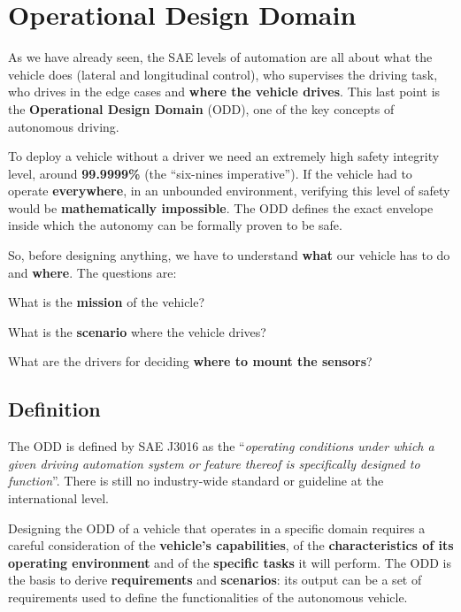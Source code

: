 \section{Operational Design Domain}

As we have already seen, the SAE levels of automation are all about what the vehicle does (lateral and longitudinal control), who supervises the driving task, who drives in the edge cases and \textbf{where the vehicle drives}.
This last point is the \textbf{Operational Design Domain} (ODD), one of the key concepts of autonomous driving.

To deploy a vehicle without a driver we need an extremely high safety integrity level, around \textbf{99.9999\%} (the ``six-nines imperative'').
If the vehicle had to operate \textbf{everywhere}, in an unbounded environment, verifying this level of safety would be \textbf{mathematically impossible}.
The ODD defines the exact envelope inside which the autonomy can be formally proven to be safe.

So, before designing anything, we have to understand \textbf{what} our vehicle has to do and \textbf{where}. The questions are:
\begin{compactitemize}
    \item What is the \textbf{mission} of the vehicle?
    \item What is the \textbf{scenario} where the vehicle drives?
    \item What are the drivers for deciding \textbf{where to mount the sensors}?
\end{compactitemize}

\subsection{Definition}
The ODD is defined by SAE J3016 as the ``\textit{operating conditions under which a given driving automation system or feature thereof is specifically designed to function}''.
There is still no industry-wide standard or guideline at the international level.

Designing the ODD of a vehicle that operates in a specific domain requires a careful consideration of the \textbf{vehicle's capabilities}, of the \textbf{characteristics of its operating environment} and of the \textbf{specific tasks} it will perform.
The ODD is the basis to derive \textbf{requirements} and \textbf{scenarios}: its output can be a set of requirements used to define the functionalities of the autonomous vehicle.

